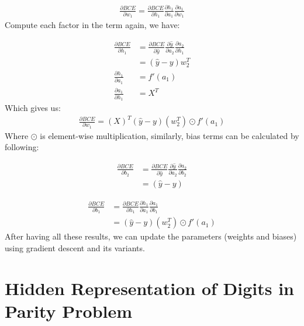 \documentclass[
]{article}
\begin{document}
\[
\begin{aligned} 
\frac{\partial BCE}{\partial w_{1}}=\frac{\partial BCE}{\partial h_1} \frac{\partial h_1}{\partial a_{1}} \frac{\partial a_{1}}{\partial w_{1}}
\end{aligned}
\] Compute each factor in the term again, we have:

\[
\begin{aligned}
\frac{\partial BCE}{\partial h_1} &= \frac{\partial BCE}{\partial \hat{y}} \frac{\partial \hat{y}}{\partial a_{2}} \frac{\partial a_{2}}{\partial h_{1}}  \\
&= \left(\hat{y}-y\right) w_{2}^T \\
\frac{\partial h_1}{\partial a_{1}} &=f'(a_1) \\
\frac{\partial a_{1}}{\partial h_{1}} &=X^T
\end{aligned}
\] Which gives us: \[
\begin{aligned}
\frac{\partial BCE}{\partial w_{1}}= \left(X\right)^T\left(\hat{y}-y\right)\left(w_{2}^T\right) \odot f'(a_1)
\end{aligned}
\] Where \(\odot\) is element-wise multiplication, similarly, bias terms
can be calculated by following:

\[
\begin{aligned} 
\frac{\partial BCE}{\partial b_{2}}&=\frac{\partial BCE}{\partial \hat{y}} \frac{\partial \hat{y}}{\partial a_{2}} \frac{\partial a_{2}}{\partial b_{2}} \\
&= \left(\hat{y}-y\right)
\end{aligned}
\]

\[
\begin{aligned} 
\frac{\partial BCE}{\partial b_{1}}&=\frac{\partial BCE}{\partial h_1} \frac{\partial h_1}{\partial a_{1}} \frac{\partial a_{1}}{\partial b_{1}} \\
&= \left(\hat{y}-y\right)\left(w_{2}^T\right) \odot f'(a_1)
\end{aligned}
\] After having all these results, we can update the parameters (weights
and biases) using gradient descent and its variants.

\hypertarget{hidden-representation-of-digits-in-parity-problem}{%
\section{Hidden Representation of Digits in Parity
Problem}\label{hidden-representation-of-digits-in-parity-problem}}
\end{document}
